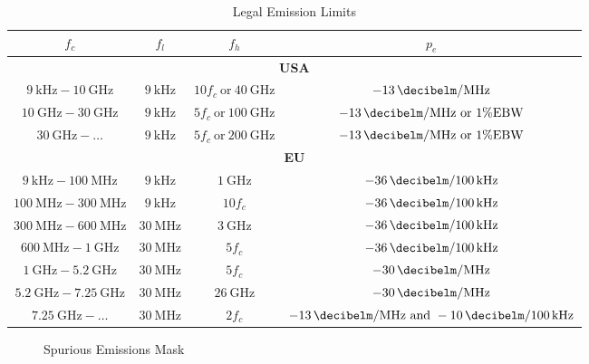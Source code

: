 \begin{table}
\centering
\caption{Legal Emission Limits}
\label{tab:legusa}
\begin{tabular}{|c|c|c|c|}
\hline
$f_c$  &  $f_l$ & $f_h$ & $p_e$ \\\hline
\multicolumn{4}{|c|}{\textbf{USA}} \\\hline
$\SI{9}{\kilo\hertz}-\SI{10}{\giga\hertz}$ & $\SI{9}{\kilo\hertz}$ & $10f_c\ \text{or}\ \SI{40}{\giga\hertz}$ & $\SI{-13}{\decibelm\per\mega\hertz}$ \\\hline
$\SI{10}{\giga\hertz}-\SI{30}{\giga\hertz}$ & $\SI{9}{\kilo\hertz}$ & $5f_c\ \text{or}\ \SI{100}{\giga\hertz}$ & $\SI{-13}{\decibelm\per\mega\hertz}\ \text{or}\ 1\% \text{EBW}$ \\\hline
$\SI{30}{\giga\hertz}-\dots$ & $\SI{9}{\kilo\hertz}$ & $5f_c\ \text{or}\ \SI{200}{\giga\hertz}$ & $\SI{-13}{\decibelm\per\mega\hertz}\ \text{or}\ 1\% \text{EBW}$ \\\hline
\multicolumn{4}{|c|}{\textbf{EU}} \\\hline
$\SI{9}{\kilo\hertz}-\SI{100}{\mega\hertz}$ & $\SI{9}{\kilo\hertz}$ & $\SI{1}{\giga\hertz}$ & $\SI{-36}{\decibelm\per \SI{100}{\kilo\hertz}}$ \\\hline
$\SI{100}{\mega\hertz}-\SI{300}{\mega\hertz}$ & $\SI{9}{\kilo\hertz}$ & $10f_c$ & $\SI{-36}{\decibelm\per \SI{100}{\kilo\hertz}}$ \\\hline
$\SI{300}{\mega\hertz}-\SI{600}{\mega\hertz}$ & $\SI{30}{\mega\hertz}$ & $\SI{3}{\giga\hertz}$ & $\SI{-36}{\decibelm\per \SI{100}{\kilo\hertz}}$ \\\hline
$\SI{600}{\mega\hertz}-\SI{1}{\giga\hertz}$ & $\SI{30}{\mega\hertz}$ & $5f_c$ & $\SI{-36}{\decibelm\per \SI{100}{\kilo\hertz}}$ \\\hline
$\SI{1}{\giga\hertz}-\SI{5.2}{\giga\hertz}$ & $\SI{30}{\mega\hertz}$ & $5f_c$ & $\SI{-30}{\decibelm\per\mega\hertz}$ \\\hline
$\SI{5.2}{\giga\hertz}-\SI{7.25}{\giga\hertz}$ & $\SI{30}{\mega\hertz}$ & $\SI{26}{\giga\hertz}$ & $\SI{-30}{\decibelm\per\mega\hertz}$ \\\hline
$\SI{7.25}{\giga\hertz}-\dots$ & $\SI{30}{\mega\hertz}$ & $2f_c$ & $\SI{-13}{\decibelm\per\mega\hertz}\ \text{and}\ \SI{-10}{\decibelm\per \SI{100}{\kilo\hertz}}$ \\\hline
\end{tabular}
\end{table}

\begin{figure}
\centering
\def\svgwidth{0.8\textwidth}

\caption{Spurious Emissions Mask}
\label{fig:sem}
\end{figure}








